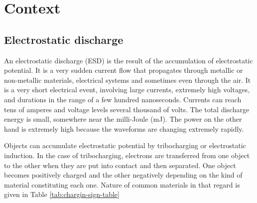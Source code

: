 \section{Context}
\subsection{Electrostatic discharge}

An electrostatic discharge (ESD) is the result of the accumulation of electrostatic potential.
It is a very sudden current flow that propagates through metallic or non-metallic materials, electrical systems and sometimes even through the air.
It is a very short electrical event, involving large currents, extremely high voltages, and durations in the range of a few hundred nanoseconds.
Currents can reach tens of amperes and voltage levels several thousand of volts.
The total discharge energy is small, somewhere near the milli-Joule (mJ).
The power on the other hand is extremely high because the waveforms are changing extremely rapidly.

Objects can accumulate electrostatic potential by tribocharging or electrostatic induction.
In the case of tribocharging, electrons are transferred from one object to the other when they are put into contact and then separated.
One object becomes positively charged and the other negatively depending on the kind of material constituting each one.
Nature of common materials in that regard is given in Table \ref{tab:chargin-sign-table}


